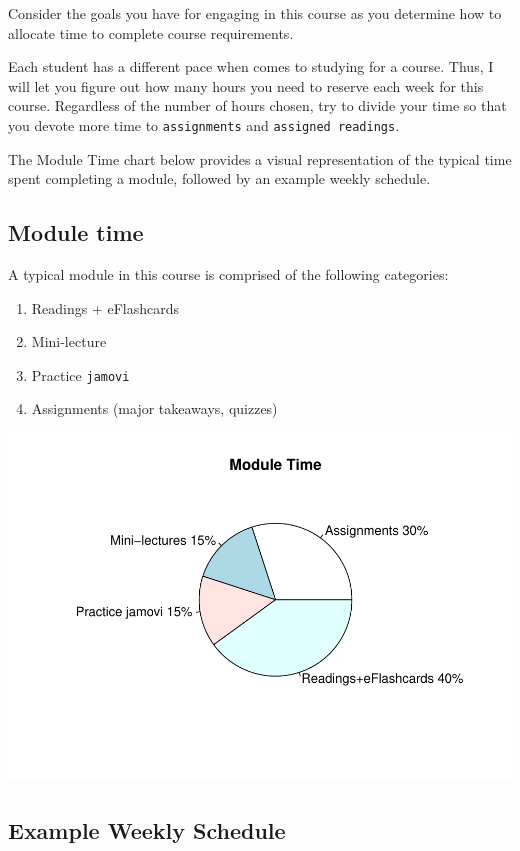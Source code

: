 \documentclass[11pt,]{article}
\makeatletter
\providecommand{\tightlist}{%
  \setlength{\itemsep}{0pt}\setlength{\parskip}{0pt}}
\def\maxwidth{\ifdim\Gin@nat@width>\linewidth\linewidth
\else\Gin@nat@width\fi}
\let\Oldincludegraphics\includegraphics
\renewcommand{\includegraphics}[1]{\Oldincludegraphics[width=\maxwidth]{#1}}
\makeatother
\begin{document}
Consider the goals you have for engaging in this course as you determine
how to allocate time to complete course requirements.

Each student has a different pace when comes to studying for a course.
Thus, I will let you figure out how many hours you need to reserve each
week for this course. Regardless of the number of hours chosen, try to
divide your time so that you devote more time to \texttt{assignments}
and \texttt{assigned\ readings}.

The Module Time chart below provides a visual representation of the
typical time spent completing a module, followed by an example weekly
schedule.

\hypertarget{module-time}{%
\subsection{Module time}\label{module-time}}

A typical module in this course is comprised of the following
categories:

\begin{enumerate}
\def\labelenumi{\arabic{enumi}.}
\tightlist
\item
  Readings + eFlashcards
\item
  Mini-lecture
\item
  Practice \texttt{jamovi}
\item
  Assignments (major takeaways, quizzes)
\end{enumerate}

\includegraphics{KIN610-FA21_files/figure-latex/unnamed-chunk-1-1.pdf}

\hypertarget{example-weekly-schedule}{%
\subsection{Example Weekly Schedule}\label{example-weekly-schedule}}
\end{document}
